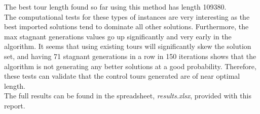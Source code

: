 \documentclass[12pt]{article}
\begin{document}
The best tour length found so far using this method has length 109380.\\

The computational tests for these types of instances are very interesting as the best imported solutions tend to dominate all other solutions. Furthermore, the max stagnant generations values go up significantly and very early in the algorithm. It seems that using existing tours will significantly skew the solution set, and having 71 stagnant generations in a row in 150 iterations shows that the algorithm is not generating any better solutions at a good probability. Therefore, these tests can validate that the control tours generated are of near optimal length.\\

The full results can be found in the spreadsheet, \textit{results.xlsx}, provided with this report.
\end{document}
